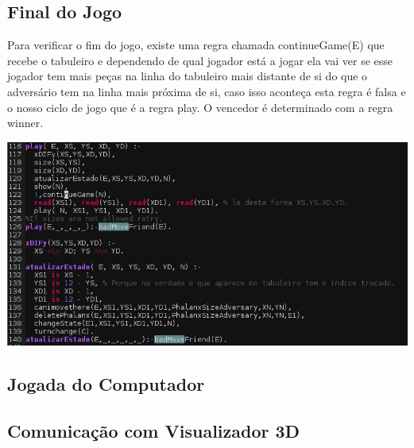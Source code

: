 \documentclass[a4paper]{article}
\begin{document}
\subsection{Final do Jogo}
Para verificar o fim do jogo, existe uma regra chamada continueGame(E) que recebe o tabuleiro e dependendo de qual jogador está a jogar ela vai ver se esse jogador tem mais peças na linha do tabuleiro mais distante de si do que o adversário tem na linha mais próxima de si, caso isso aconteça esta regra é falsa e o nosso ciclo de jogo que é a regra play. O vencedor é determinado com a regra winner.

\begin{center}
\includegraphics[scale=0.50]{jjj.png}
\end{center}

\subsection{Jogada do Computador}

\subsection{Comunicação com Visualizador 3D}
\end{document}

